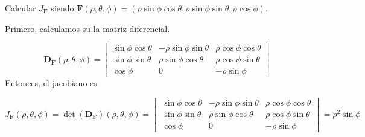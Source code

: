    \begin{example}  Calcular $J_\mathbf{F}$   siendo  \( \mathbf{F}(\rho, \theta, \phi)  = (\rho\sin\phi\cos\theta, \rho\sin\phi\sin\theta, \rho\cos\phi) \). 
   \label{ej:jacobiano_esferico}
   
    Primero, calculamos su la matriz diferencial.
   
    \[
    \boldsymbol{D}_{\mathbf{F}}(\rho, \theta, \phi) 
    =
    \begin{bmatrix}
    \sin\phi \cos\theta & -\rho \sin\phi \sin\theta & \rho \cos\phi \cos\theta \\
    \sin\phi \sin\theta & \rho \sin\phi \cos\theta & \rho \cos\phi \sin\theta \\
    \cos\phi & 0 & -\rho \sin\phi
    \end{bmatrix}
    \]
     Entonces, el jacobiano es 
    
    \[
    J_\mathbf{F}(\rho, \theta, \phi)  = \det(\boldsymbol{D}_{\mathbf{F}})(\rho, \theta, \phi)  = \begin{vmatrix}
        \sin\phi \cos\theta & -\rho \sin\phi \sin\theta & \rho \cos\phi \cos\theta \\
        \sin\phi \sin\theta & \rho \sin\phi \cos\theta & \rho \cos\phi \sin\theta \\
        \cos\phi & 0 & -\rho \sin\phi
        \end{vmatrix}=\rho^2 \sin\phi
    \]
    
    
    \end{example}
